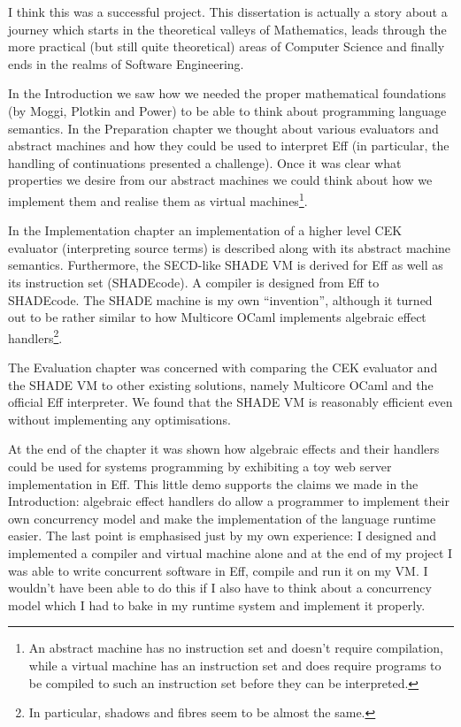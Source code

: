 \documentclass[class=article, crop=false]{standalone}
\begin{document}
I think this was a successful project. This dissertation is actually a story about a journey
which starts in the theoretical valleys of Mathematics, leads through the more practical
(but still quite theoretical) areas of Computer Science and finally ends in the realms of Software
Engineering.

In the Introduction we saw how we needed the proper mathematical foundations (by Moggi, Plotkin and Power) to be able to think
about programming language semantics. In the Preparation chapter we thought about various evaluators and abstract machines and
how they could be used to interpret Eff (in particular, the handling of continuations presented a challenge). Once it was clear
what properties we desire from our abstract machines we could think about how we implement them and realise them as virtual
machines\footnote{An abstract machine has no instruction set and doesn't require compilation, while a virtual machine has an
instruction set and does require programs to be compiled to such an instruction set before they can be interpreted.}.

In the Implementation chapter an implementation of a higher level CEK evaluator (interpreting source terms) is described along
with its abstract machine semantics. Furthermore, the SECD-like SHADE VM is derived for Eff as well as its instruction set
(SHADEcode). A compiler is designed from Eff to SHADEcode. The SHADE machine is my own ``invention'', although it turned out
to be rather similar to how Multicore OCaml implements algebraic effect handlers\footnote{In particular, shadows and fibres
seem to be almost the same.}.

The Evaluation chapter was concerned with comparing the CEK evaluator and the SHADE VM to other existing solutions, namely
Multicore OCaml and the official Eff interpreter. We found that the SHADE VM is reasonably efficient even without implementing
any optimisations. 

At the end of the chapter it was shown how algebraic effects and their handlers
could be used for systems programming by exhibiting a toy web server implementation in Eff. This little demo supports the claims
we made in the Introduction: algebraic effect handlers do allow a programmer to implement their own concurrency model and
make the implementation of the language runtime easier. The last point is emphasised just by my own experience: I designed
and implemented a compiler and virtual machine alone and at the end of my project I was able to write concurrent software in Eff, compile and
run it on my VM. I wouldn't have been able to do this if I also have to think about a concurrency model which I had to bake in
my runtime system and implement it properly.
\end{document}
